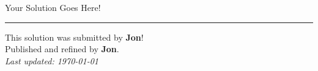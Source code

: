 \documentclass[12pt]{article}
\begin{document}
	
	Your Solution Goes Here!
	
	\newpage
	\hrule

	\begin{center}
		This solution was submitted by \textbf{Jon}!\\[4pt]
		Published and refined by \textbf{Jon}.\\[8pt]
		\textit{Last updated: \today}
	\end{center}
	
\end{document}
